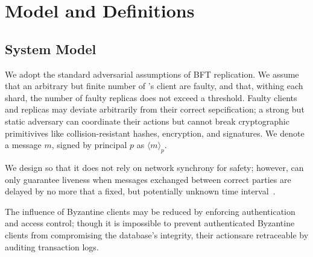 \section{Model and Definitions}


\subsection{System Model}

We adopt the standard adversarial assumptions of BFT replication. We assume that an arbitrary but finite number of \sys's client are faulty, and that, withing each shard, the number of faulty replicas does not exceed a threshold. Faulty clients and replicas may  deviate arbitrarily from their correct sepcification;  a strong but static adversary can coordinate their actions but cannot  break cryptographic primitivives  like collision-resistant hashes, encryption, and signatures. We denote a message $m$, signed by principal $p$ as $\langle m \rangle_p$.

We design \sys{} so that it does not rely on network synchrony for safety; however, \sys can only guarantee liveness when messages exchanged between correct parties are delayed by no more that a fixed, but potentially unknown time interval~\cite{fischer1985impossibility}.


The influence of Byzantine clients may be reduced by enforcing authentication and access control; though it is impossible to prevent authenticated Byzantine clients from compromising the database's integrity, their actionsare  retraceable by auditing transaction logs.
